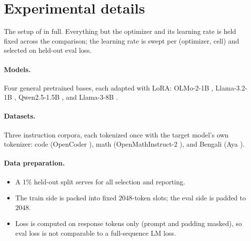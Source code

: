 \documentclass[11pt]{article}
\theoremstyle{plain}
\theoremstyle{definition}
\theoremstyle{remark}
\begin{document}
\appendix
\section{Experimental details}
\label{app:exp}
The setup of  in full. Everything but the optimizer and its learning rate
is held fixed across the comparison; the learning rate is swept per (optimizer, cell) and
selected on held-out eval loss.

\paragraph{Models.} Four general pretrained bases, each adapted with LoRA: OLMo-2-1B \cite{olmo2}, Llama-3.2-1B \cite{llama3}, Qwen2.5-1.5B \cite{qwen25}, and Llama-3-8B \cite{llama3}.

\paragraph{Datasets.} Three instruction corpora, each tokenized once with the target model's own tokenizer: code (OpenCoder \cite{opencoder}), math (OpenMathInstruct-2 \cite{openmathinstruct2}), and Bengali (Aya \cite{aya}).

\paragraph{Data preparation.}
\begin{itemize}[leftmargin=1.5em,itemsep=1pt,topsep=2pt]
  \item A $1\%$ held-out split serves for all selection and reporting.
  \item The train side is packed into fixed $2048$-token slots; the eval side is padded to $2048$.
  \item Loss is computed on response tokens only (prompt and padding masked), so eval loss is not comparable to a full-sequence LM loss.
\end{itemize}
\end{document}
